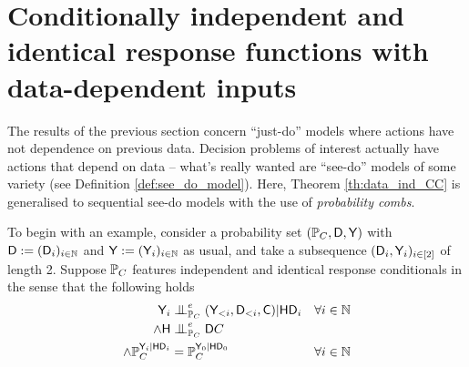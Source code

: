 
\section[Data-dependent inputs]{Conditionally independent and identical response functions with data-dependent inputs}\label{sec:data_dependent}

The results of the previous section concern ``just-do'' models where actions have not dependence on previous data. Decision problems of interest actually have actions that depend on data -- what's really wanted are ``see-do'' models of some variety (see Definition \ref{def:see_do_model}). Here, Theorem \ref{th:data_ind_CC} is generalised to sequential see-do models with the use of \emph{probability combs}.

To begin with an example, consider a probability set $(\mathbb{P}_C,\mathsf{D},\mathsf{Y})$ with $\mathsf{D}:=(\mathsf{D}_i)_{i\in\mathbb{N}}$ and $\mathsf{Y}:=(\mathsf{Y}_i)_{i\in\mathbb{N}}$ as usual, and take a subsequence $(\mathsf{D}_i,\mathsf{Y}_i)_{i\in [2]}$ of length 2. Suppose $\mathbb{P}_C$ features independent and identical response conditionals in the sense that the following holds
\begin{align}
    \RV{Y}_i&\CI^e_{\prob{P}_C} (\RV{Y}_{<i},\RV{D}_{<i},\RV{C})|\RV{H}\RV{D}_i&\forall i\in \mathbb{N}\\
    \land \RV{H} &\CI^e_{\prob{P}_C} \RV{D} C\\
    \land \prob{P}_C^{\RV{Y}_i|\RV{H}\RV{D}_i} &= \prob{P}_C^{\RV{Y}_0|\RV{H}\RV{D}_0} & \forall i\in \mathbb{N}
\end{align}

